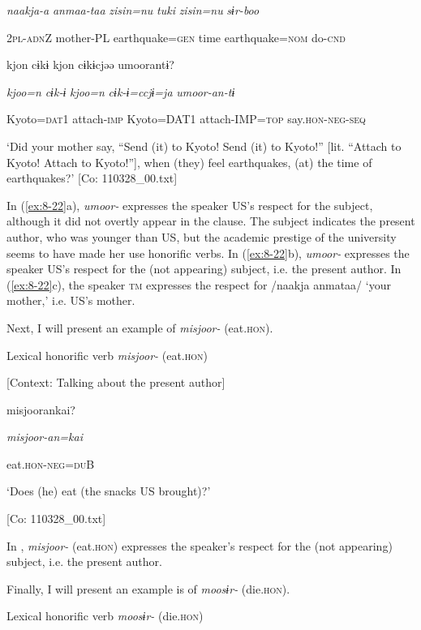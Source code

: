       \textit{naakja-a}  \textit{anmaa-taa}  \textit{zisin=nu}  \textit{tuki}  \textit{zisin=nu}  \textit{sɨr-boo}

      2\textsc{pl}-\textsc{adn}Z  mother-PL  earthquake=\textsc{gen}  time  earthquake=\textsc{nom}  do-\textsc{cnd}

      kjon  cɨkɨ  kjon  cɨkɨcjəə  umoorantɨ?

      \textit{kjoo=n}  \textit{cɨk-ɨ}  \textit{kjoo=n}  \textit{cɨk-ɨ=ccjɨ=ja}  \textit{umoor{}-an-tɨ}

      Kyoto=\textsc{dat}1  attach-\textsc{imp}  Kyoto=DAT1  attach-IMP=\textsc{top}  say.\textsc{hon}-\textsc{neg}-\textsc{seq}

\glt ‘Did your mother say, “Send (it) to Kyoto! Send (it) to Kyoto!” [lit. “Attach to Kyoto! Attach to Kyoto!”], when (they) feel earthquakes, (at) the time of earthquakes?’ [Co: 110328\_00.txt]
\z

In (\ref{ex:8-22}a), \textit{umoor-} expresses the speaker US’s respect for the subject, although it did not overtly appear in the clause. The subject indicates the present author, who was younger than US, but the academic prestige of the university seems to have made her use honorific verbs. In (\ref{ex:8-22}b), \textit{umoor-} expresses the speaker US’s respect for the (not appearing) subject, i.e. the present author. In (\ref{ex:8-22}c), the speaker \textsc{tm} expresses the respect for /naakja anmataa/ ‘your mother,’ i.e. US’s mother.

Next, I will present an example of \textit{misjoor-} (eat.\textsc{hon}).

\ea\label{ex:8-23}
  Lexical honorific verb \textit{misjoor-} (eat.\textsc{hon})

  [Context: Talking about the present author]

 {\US}
\glll   misjoorankai?

    \textit{misjoor{}-an=kai}

    eat.\textsc{hon}-\textsc{neg}=\textsc{du}B

    ‘Does (he) eat (the snacks US brought)?’

    [Co: 110328\_00.txt]
\z

In , \textit{misjoor-} (eat.\textsc{hon}) expresses the speaker’s respect for the (not appearing) subject, i.e. the present author.

  Finally, I will present an example is of \textit{moosɨr-} (die.\textsc{hon}).

\ea\label{ex:8-24}
  Lexical honorific verb \textit{moosɨr-} (die.\textsc{hon})


